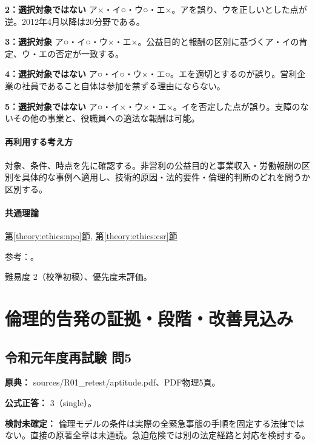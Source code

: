 \noindent\textbf{2：選択対象ではない} ア×・イ○・ウ○・エ×。アを誤り、ウを正しいとした点が逆。2012年4月以降は20分野である。\par

\noindent\textbf{3：選択対象} ア○・イ○・ウ×・エ×。公益目的と報酬の区別に基づくア・イの肯定、ウ・エの否定が一致する。\par

\noindent\textbf{4：選択対象ではない} ア○・イ○・ウ×・エ○。エを適切とするのが誤り。営利企業の社員であること自体は参加を禁ずる理由にならない。\par

\noindent\textbf{5：選択対象ではない} ア○・イ×・ウ×・エ×。イを否定した点が誤り。支障のないその他の事業と、役職員への適法な報酬は可能。\par

\paragraph{再利用する考え方} 対象、条件、時点を先に確認する。非営利の公益目的と事業収入・労働報酬の区別を具体的な事例へ適用し、技術的原因・法的要件・倫理的判断のどれを問うか区別する。

\paragraph{共通理論} \hyperref[theory:ethics:npo]{第\ref*{theory:ethics:npo}節}, \hyperref[theory:ethics:csr]{第\ref*{theory:ethics:csr}節}

\par 参考：\cite{cabinet_npo_overview,cabinet_npo_officers}。

\par 難易度 2（校準初稿）、優先度未評価。

\section{倫理的告発の証拠・段階・改善見込み}

\subsection{令和元年度再試験 問5}
\label{q:r01-ret-apt-05}

\noindent\textbf{原典：} sources/R01\_retest/aptitude.pdf、PDF物理5頁。

\textbf{公式正答：} 3（single）。

\par\textbf{検討未確定：} 倫理モデルの条件は実際の全緊急事態の手順を固定する法律ではない。直接の原著全章は未通読。急迫危険では別の法定経路と対応を検討する。

